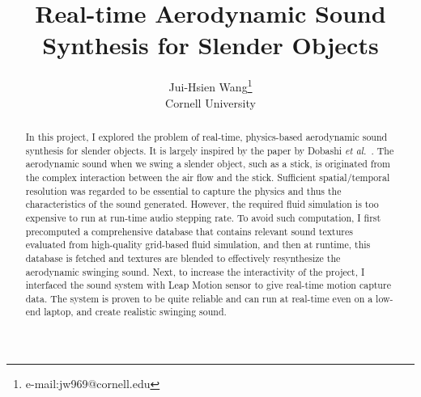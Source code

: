 \documentclass[tog]{acmsiggraph}
\title{Real-time Aerodynamic Sound Synthesis for Slender Objects }
\author{Jui-Hsien Wang\thanks{e-mail:jw969@cornell.edu}\\Cornell University}
\def\etal{\emph{et al.}}
\begin{document}


\maketitle

\begin{abstract}

In this project, I explored the problem of real-time, physics-based aerodynamic sound synthesis for slender objects. It is largely inspired by the paper by Dobashi \etal~\cite{dobashi2003}. The aerodynamic sound when we swing a slender object, such as a stick, is originated from the complex interaction between the air flow and the stick. Sufficient spatial/temporal resolution was regarded to be essential to capture the physics and thus the characteristics of the sound generated. However, the required fluid simulation is too expensive to run at run-time audio stepping rate. To avoid such computation, I first precomputed a comprehensive database that contains relevant sound textures evaluated from high-quality grid-based fluid simulation, and then at runtime, this database is fetched and textures are blended to effectively resynthesize the aerodynamic swinging sound. Next, to increase the interactivity of the project, I interfaced the sound system with Leap Motion sensor to give real-time motion capture data. The system is proven to be quite reliable and can run at real-time even on a low-end laptop, and create realistic swinging sound. 

\end{abstract}

\end{document}
